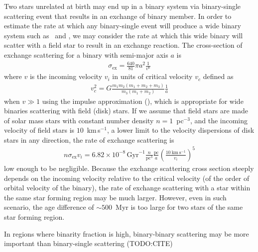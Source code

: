 \documentclass[manuscript]{aastex6}
\newcommand{\sunanalog}{\text{HD 240429}}
\newcommand{\bizarreone}{\text{HD 240430}}
\newcommand{\todo}[1]{{\color{blue}TODO:#1}}
\begin{document}
Two stars unrelated at birth may end up in a binary system via binary-single scattering event
that results in an exchange of binary member.
In order to estimate the rate at which any binary-single
event will produce a wide binary system such as \sunanalog\ and \bizarreone,
we may consider the rate at which this wide binary will scatter with a field star to
result in an exchange reaction.
The cross-section of exchange scattering for a binary with semi-major axis $a$ is
\begin{eqnarray}
  \sigma_\mathrm{ex} = \frac{640}{81} \pi a^{2} \frac{1}{v^6}
\end{eqnarray}
where $v$ is the incoming velocity $v_i$ in units of critical velocity $v_c$ defined as
\begin{eqnarray}
  v_c^2 = G \frac{m_1 m_2 (m_1 + m_2 + m_3)}{m_3 (m_1 + m_2)} \frac{1}{a}
\end{eqnarray}
when $v \gg 1$ using the impulse approximation (\citealt{Hut:1983aa,Hut:1983ab}),
which is appropriate for wide binaries scattering with field (disk) stars.
If we assume that field stars are made of solar mass stars
with constant number density $n=1$~pc$^{-3}$, and the incoming velocity of field stars
is $10$~km\,s$^{-1}$, a lower limit to the velocity dispersions of disk
stars in any direction, the rate of exchange scattering is
\begin{eqnarray}
  n \sigma_\mathrm{ex} v_i = 6.82\times 10^{-8}\,\mathrm{Gyr}^{-1}
  \frac{n}{\mathrm{pc}^3} \frac{\mathrm{pc}}{a} \left(\frac{10~\mathrm{km}\,\mathrm{s}^{-1}}{v_i}\right)^5
\end{eqnarray}
low enough to be negligible.
Because the exchange scattering cross section steeply depends on the incoming velocity
relative to the critical velocity (of the order of orbital velocity of the binary),
the rate of exchange scattering with a star within the same star forming region
may be much larger.
However, even in such scenario, the age difference of $\sim 500$~Myr is too large
for two stars of the same star forming region.

In regions where binarity fraction is high, binary-binary scattering may be more important
than binary-single scattering (\todo{CITE})


\end{document}
